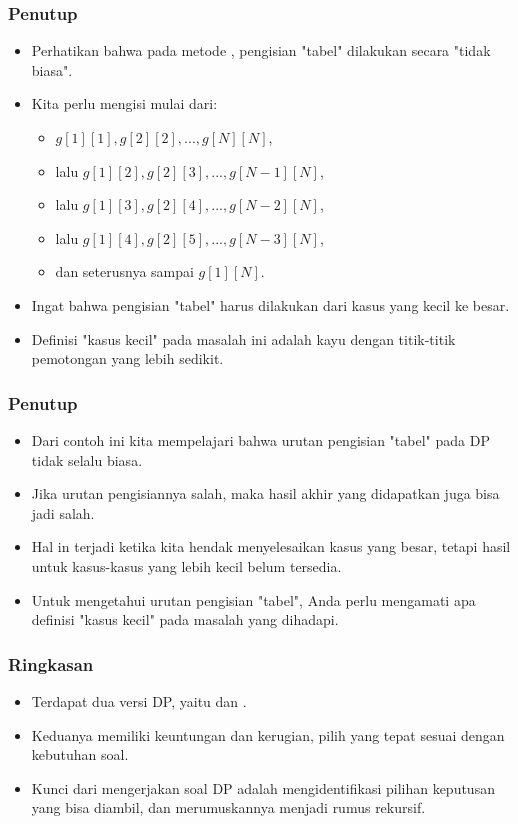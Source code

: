 \begin{frame}
\frametitle{Penutup}
\begin{itemize}
  \item Perhatikan bahwa pada metode \fbottomup, pengisian "tabel" dilakukan secara "tidak biasa".
  \item Kita perlu mengisi mulai dari:
  \begin{itemize}
    \item $g[1][1], g[2][2], ..., g[N][N]$,
    \item lalu $g[1][2], g[2][3], ..., g[N-1][N]$,
    \item lalu $g[1][3], g[2][4], ..., g[N-2][N]$,
    \item lalu $g[1][4], g[2][5], ..., g[N-3][N]$,    
    \item dan seterusnya sampai $g[1][N]$.
  \end{itemize}
  \item Ingat bahwa pengisian "tabel" harus dilakukan dari kasus yang kecil ke besar.
  \item Definisi "kasus kecil" pada masalah ini adalah kayu dengan titik-titik pemotongan yang lebih sedikit.
\end{itemize}
\end{frame}

\begin{frame}
\frametitle{Penutup}
\begin{itemize}
  \item Dari contoh ini kita mempelajari bahwa urutan pengisian "tabel" pada DP \fbottomup tidak selalu biasa.
  \item Jika urutan pengisiannya salah, maka hasil akhir yang didapatkan juga bisa jadi salah.
  \item Hal in terjadi ketika kita hendak menyelesaikan kasus yang besar, tetapi hasil untuk kasus-kasus yang lebih kecil belum tersedia.
  \item Untuk mengetahui urutan pengisian "tabel", Anda perlu mengamati apa definisi "kasus kecil" pada masalah yang dihadapi.
\end{itemize}
\end{frame}

\begin{frame}
\frametitle{Ringkasan}
\begin{itemize}
  \item Terdapat dua versi DP, yaitu \ftopdown dan \fbottomup.
  \item Keduanya memiliki keuntungan dan kerugian, pilih yang tepat sesuai dengan kebutuhan soal.
  \item Kunci dari mengerjakan soal DP adalah mengidentifikasi pilihan keputusan yang bisa diambil, dan merumuskannya menjadi rumus rekursif.
\end{itemize}
\end{frame}

